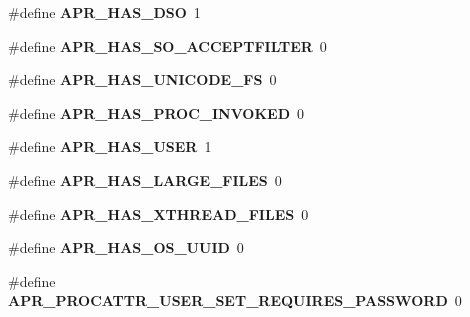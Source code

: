 \begin{DoxyCompactItemize}
\item 
\#define {\bfseries A\+P\+R\+\_\+\+H\+A\+S\+\_\+\+D\+SO}~1\hypertarget{group__apr__platform_gae41e3d3c78f6937ea2de78b03629494a}{}\label{group__apr__platform_gae41e3d3c78f6937ea2de78b03629494a}

\item 
\#define {\bfseries A\+P\+R\+\_\+\+H\+A\+S\+\_\+\+S\+O\+\_\+\+A\+C\+C\+E\+P\+T\+F\+I\+L\+T\+ER}~0\hypertarget{group__apr__platform_gaa6797fde63363c83c54c97a2a873e84d}{}\label{group__apr__platform_gaa6797fde63363c83c54c97a2a873e84d}

\item 
\#define {\bfseries A\+P\+R\+\_\+\+H\+A\+S\+\_\+\+U\+N\+I\+C\+O\+D\+E\+\_\+\+FS}~0\hypertarget{group__apr__platform_gae1e6a359fe305ed4ede275f404e61cfe}{}\label{group__apr__platform_gae1e6a359fe305ed4ede275f404e61cfe}

\item 
\#define {\bfseries A\+P\+R\+\_\+\+H\+A\+S\+\_\+\+P\+R\+O\+C\+\_\+\+I\+N\+V\+O\+K\+ED}~0\hypertarget{group__apr__platform_gacd61f2c191c71203833599e8caee3e79}{}\label{group__apr__platform_gacd61f2c191c71203833599e8caee3e79}

\item 
\#define {\bfseries A\+P\+R\+\_\+\+H\+A\+S\+\_\+\+U\+S\+ER}~1\hypertarget{group__apr__platform_ga9d8d5646ade1d3d29e456d8df29a656a}{}\label{group__apr__platform_ga9d8d5646ade1d3d29e456d8df29a656a}

\item 
\#define {\bfseries A\+P\+R\+\_\+\+H\+A\+S\+\_\+\+L\+A\+R\+G\+E\+\_\+\+F\+I\+L\+ES}~0\hypertarget{group__apr__platform_gab5019720a44a0a412b053bd4c8275ac0}{}\label{group__apr__platform_gab5019720a44a0a412b053bd4c8275ac0}

\item 
\#define {\bfseries A\+P\+R\+\_\+\+H\+A\+S\+\_\+\+X\+T\+H\+R\+E\+A\+D\+\_\+\+F\+I\+L\+ES}~0\hypertarget{group__apr__platform_ga98aef4781225d1713d088283f4abd8f2}{}\label{group__apr__platform_ga98aef4781225d1713d088283f4abd8f2}

\item 
\#define {\bfseries A\+P\+R\+\_\+\+H\+A\+S\+\_\+\+O\+S\+\_\+\+U\+U\+ID}~0\hypertarget{group__apr__platform_gae5e245b691c1f1765e547480de321731}{}\label{group__apr__platform_gae5e245b691c1f1765e547480de321731}

\item 
\#define {\bfseries A\+P\+R\+\_\+\+P\+R\+O\+C\+A\+T\+T\+R\+\_\+\+U\+S\+E\+R\+\_\+\+S\+E\+T\+\_\+\+R\+E\+Q\+U\+I\+R\+E\+S\+\_\+\+P\+A\+S\+S\+W\+O\+RD}~0\hypertarget{group__apr__platform_ga0108ca8b595e62174e8b42cce0d063f5}{}\label{group__apr__platform_ga0108ca8b595e62174e8b42cce0d063f5}


\end{DoxyCompactItemize}
